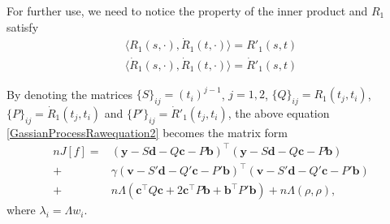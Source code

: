 For further use, we need to notice the property of the inner product and $R_1$ satisfy 
\begin{align}
\langle R_1(s,\cdot),\dot{R}_1(t,\cdot)\rangle = R'_1(s,t) \\
\langle \dot{R}_1(s,\cdot),\dot{R}_1(t,\cdot)\rangle = \dot{R}'_1(s,t) 
\end{align}


By denoting the matrices $\{S\}_{ij}=(t_i)^{j-1}$, $j=1,2$, $\{Q\}_{ij}=R_1(t_j,t_i)$, $\{P\}_{ij}=\dot{R}_1(t_j,t_i)$ and $\{P'\}_{ij}=\dot{R}'_1(t_j,t_i)$, the above equation \eqref{GassianProcessRawequation2} becomes the matrix form 
\begin{equation}\label{matriteq2}
\begin{split}
nJ[f]=&\left(\mathbf{y}-S\mathbf{d}-Q\mathbf{c}-P\mathbf{b}\right)^\top \left(\mathbf{y}-S\mathbf{d}-Q\mathbf{c}-P\mathbf{b}\right)\\
+&\gamma\left(\mathbf{v}-S'\mathbf{d}-Q'\mathbf{c}-P'\mathbf{b}\right)^\top \left(\mathbf{v}-S'\mathbf{d}-Q'\mathbf{c}-P'\mathbf{b}\right)\\
+&n\Lambda\left(\mathbf{c}^\top Q\mathbf{c} + 2\mathbf{c}^\top P\mathbf{b}+ \mathbf{b}^\top P'\mathbf{b}\right)+n\Lambda(\rho,\rho),
\end{split}
\end{equation}
where $\lambda_i=\Lambda w_i$. 

